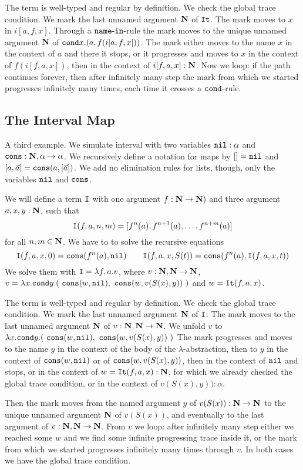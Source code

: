 \documentclass{article}
\begin{document}
The term is well-typed and regular by definition. We check the global trace condition. 
We mark the last unnamed argument ${\bf N}$ of ${\tt It}$. The mark moves to $x$ in $ i[a,f,x]$.
 Through a ${\tt name\mbox{-}in}$-rule the mark moves to the unique unnamed argument ${\bf N}$ of  
$ {\tt cond} x. (a, f( i[a,f,x]) )$.
The mark either moves to the name $x$ in the context of $a$ and there it stops, or 
it progresses and moves to $x$ in the context of $f(i[f,a,x])$, then in the context of $i[f,a,x]:{\bf N}$.
Now we loop: if the path continues forever, then after infinitely many step the mark from which we started 
progresses infinitely many times, each time it crosses a ${\tt cond}$-rule.



\subsection{The Interval Map}
A third example. We simulate interval with two variables ${\tt nil}:\alpha$ and 
${\tt cons}:{\bf N},\alpha \rightarrow \alpha$. We recursively define a notation for maps by $[]={\tt nil}$
and $[a,\vec{a}] = {\tt cons}(a,[\vec{a}])$. We add no elimination rules for lists, though,
only the variables ${\tt nil}$ and ${\tt cons}$.

We will define a term ${\tt I}$ with one argument $f:{\bf N} \rightarrow {\bf N})$ and three argument
$a,x,y:{\bf N}$, such that 
$$
{\tt I}(f,a,n,m) = [f^n(a), f^{n+1}(a), \ldots, f^{n+m}(a)]
$$ 
for all $n,m \in {\bf N}$. 
We have to to solve the recursive equations 
$$
\Interval(f,a,x,0) = \cons(f^n(a), \nil) 
\ \ \ \ \ \ 
\Interval(f,a,x,S(t)) = \cons(f^n(a), \Interval(f,a,x,t) )
$$ 
We solve them with ${\tt I} = \lambda f,a.v$,
where $v:{\bf N},{\bf N}\rightarrow {\bf N}$, 
$v = \lambda x.\cond y. (\ \cons(w, \nil),  \  \cons(w, v(S(x),y)) \ )$ and $w={\tt It}(f,a,x)$.

The term is well-typed and regular by definition. We check the global trace condition.
We mark the last unnamed argument ${\bf N}$ of ${\tt I}$.
The mark moves to the last unnamed argument ${\bf N}$ of  
$v:{\bf N},{\bf N} \rightarrow {\bf N}$. 
We unfold $v$ to $\lambda x.{\tt cond} y. 
(\ {\tt cons}(w, {\tt nil}),  \  {\tt cons}(w, v(S(x),y)) \ )$
The mark progresses and moves to the name $y$ in the context of the body of the $\lambda$-abstraction,
then to $y$ in the context of ${\tt cons}(w, {\tt nil})$ or of ${\tt cons}(w, v(S(x),y))$,
then in the context of ${\tt nil}$ and stops, or in the context of $w={\tt It}(f,a,x):{\bf N}$, 
for which we already checked the global trace condition, or in the context of $v(S(x),y)):\alpha$. 

Then the mark moves from the named argument $y$ of $v(S(x)):{\bf N} \rightarrow {\bf N}$ to the unique 
unnamed argument ${\bf N}$ of $v(S(x))$, and eventually to the last argument of $v:{\bf N},{\bf N}\rightarrow {\bf N}$. 
From $v$ we loop: after infinitely many step either we reached some $w$ and we find 
some infinite progressing trace inside it, or the
mark from which we started progresses infinitely many times through $v$. In both cases we have the
global trace condition.
\end{document}
